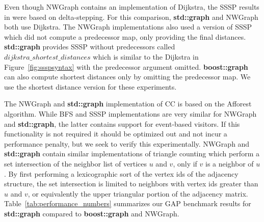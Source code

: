 Even though NWGraph contains an implementation of Dijkstra, the SSSP results in \cite{REF_nwgraph_library}
were based on delta-stepping. For this comparison, \textbf{std::graph} and NWGraph both use Dijkstra.
The NWGraph implementations also used a version of SSSP which did not compute
a predecessor map, only providing the final distances.
\textbf{std::graph} provides SSSP without predecessors called $dijkstra\_shortest\_distances$ which is similar to the Dijkstra in
Figure~\ref{fig:ssspsyntax} with the predecessor argument omitted.
\textbf{boost::graph} can also compute shortest distances only by omitting the predecessor map.
We use the shortest distance version for these experiments.

The NWGraph and \textbf{std::graph} implementation of CC is based on the Afforest \cite{sutton2018optimizing} algorithm.
While BFS and SSSP implementations are very similar for NWGraph and \textbf{std::graph}, the latter contains
support for event-based visitors.
If this functionality is not required it should be optimized out and not
incur a performance penalty,
but we seek to verify this experimentally.
NWGraph and \textbf{std::graph} contain similar implementations of triangle
counting which perform a set intersection of the neighbor list of vertices
$u$ and $v$, only if $v$ is a neighbor of $u$.
By first performing a lexicographic sort of the vertex ids of the adjacency
structure, the set intersection is limited to neighbors with vertex ids greater
than $u$ and $v$, or equivalently the upper triangular portion of the adjacency
matrix.
Table~\ref{tab:performance_numbers} summarizes our GAP benchmark results for \textbf{std::graph} compared to \textbf{boost::graph} and NWGraph.

